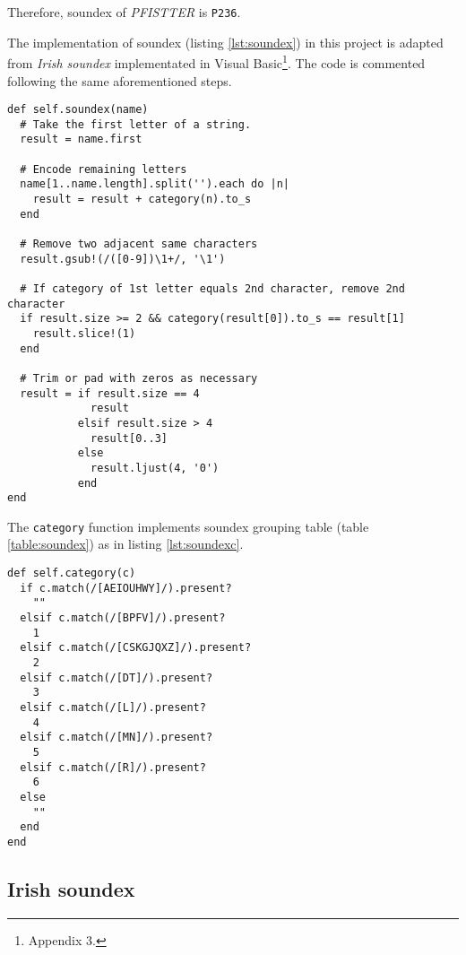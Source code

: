 Therefore, soundex of \emph{PFISTTER} is \texttt{P236}.

The implementation of soundex (listing \ref{lst:soundex}) in this project is adapted from
\citeauthor{adamw} \emph{Irish soundex} implementated in Visual Basic\footnote{\cite{adamw} Appendix 3.}.
The code is commented following the same aforementioned steps.

\begin{minipage}{\linewidth}
\begin{lstlisting}[label={lst:soundex}, caption={Soundex implementation.}]
def self.soundex(name)
  # Take the first letter of a string.
  result = name.first

  # Encode remaining letters
  name[1..name.length].split('').each do |n|
    result = result + category(n).to_s
  end

  # Remove two adjacent same characters
  result.gsub!(/([0-9])\1+/, '\1')

  # If category of 1st letter equals 2nd character, remove 2nd character
  if result.size >= 2 && category(result[0]).to_s == result[1]
    result.slice!(1)
  end

  # Trim or pad with zeros as necessary
  result = if result.size == 4
             result
           elsif result.size > 4
             result[0..3]
           else
             result.ljust(4, '0')
           end
end
\end{lstlisting}
\end{minipage}

The \texttt{category} function implements soundex grouping table (table \ref{table:soundex})
as in listing \ref{lst:soundexc}.

\begin{minipage}{\linewidth}
\begin{lstlisting}[label={lst:soundexc}, caption={Soundex grouping table implementation.}]
def self.category(c)
  if c.match(/[AEIOUHWY]/).present?
    ""
  elsif c.match(/[BPFV]/).present?
    1
  elsif c.match(/[CSKGJQXZ]/).present?
    2
  elsif c.match(/[DT]/).present?
    3
  elsif c.match(/[L]/).present?
    4
  elsif c.match(/[MN]/).present?
    5
  elsif c.match(/[R]/).present?
    6
  else
    ""
  end
end
\end{lstlisting}
\end{minipage}

\subsection{Irish soundex}

